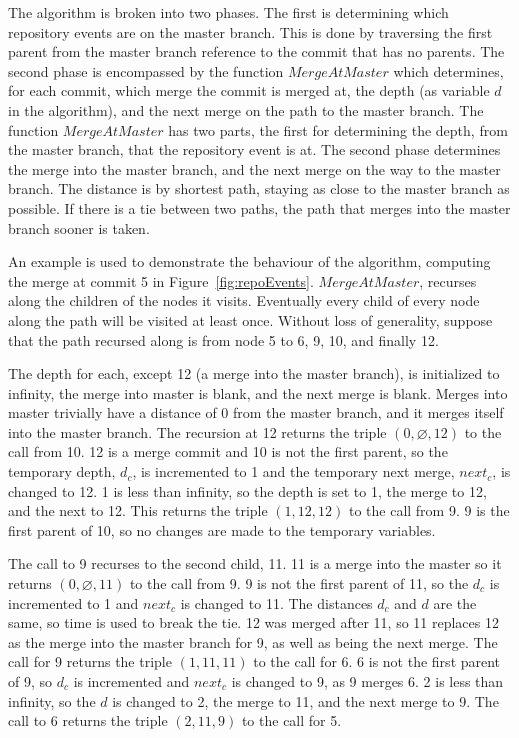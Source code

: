 The algorithm is broken into two phases. The first is determining which
repository events are on the master branch. This is done by traversing
the first parent from the master branch reference to the commit that has
no parents. The second phase is encompassed by the function
$MergeAtMaster$ which determines, for each commit, which merge the
commit is merged at, the depth (as variable $d$ in the algorithm), and
the next merge on the path to the master branch. The function
$MergeAtMaster$ has two parts, the first for determining the depth, from
the master branch, that the repository event is at. The second phase
determines the merge into the master branch, and the next merge on the
way to the master branch. The distance is by shortest path, staying as
close to the master branch as possible. If there is a tie between two
paths, the path that merges into the master branch sooner is taken.

An example is used to demonstrate the behaviour of the algorithm,
computing the merge at commit 5 in Figure~\ref{fig:repoEvents}.
$MergeAtMaster$, recurses along the children of the nodes it visits.
Eventually every child of every node along the path will be visited at
least once. Without loss of generality, suppose that the path recursed
along is from node 5 to 6, 9, 10, and finally 12.

The depth for each, except 12 (a merge into the master branch), is
initialized to infinity, the merge into master is blank, and the next
merge is blank. Merges into master trivially have a distance of 0 from
the master branch, and it merges itself into the master branch. The
recursion at 12 returns the triple $(0, \varnothing, 12)$ to the call
from 10. 12 is a merge commit and 10 is not the first parent, so the
temporary depth, $d_c$, is incremented to 1 and the temporary next
merge, $next_c$, is changed to 12. 1 is less than infinity, so the depth
is set to 1, the merge to 12, and the next to 12. This returns the
triple $(1, 12, 12)$ to the call from 9. 9 is the first parent of 10, so
no changes are made to the temporary variables.

The call to 9 recurses to the second child, 11. 11 is a merge into the
master so it returns $(0, \varnothing, 11)$ to the call from 9. 9 is not
the first parent of 11, so the $d_c$ is incremented to 1 and $next_c$ is
changed to 11. The distances $d_c$ and $d$ are the same, so time is used
to break the tie. 12 was merged after 11, so 11 replaces 12 as the
merge into the master branch for 9, as well as being the next merge. The
call for 9 returns the triple $(1, 11, 11)$ to the call for 6. 6 is not
the first parent of 9, so $d_c$ is incremented and $next_c$ is changed
to 9, as 9 merges 6. 2 is less than infinity, so the $d$ is changed to
2, the merge to 11, and the next merge to 9. The call to 6 returns the
triple $(2, 11, 9)$ to the call for 5.


